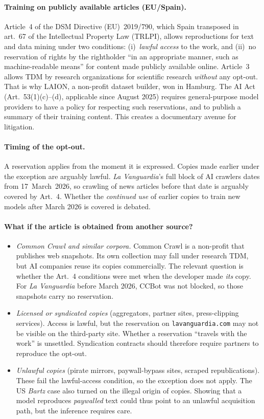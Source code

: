 \documentclass[10pt,a4paper]{article}
\begin{document}
\paragraph{Training on publicly available articles (EU/Spain).} Article~4 of the DSM Directive (EU)~2019/790, which
Spain transposed in art.~67 of the Intellectual Property Law (TRLPI), allows reproductions for text and data mining
under two conditions: (i)~\emph{lawful access} to the work, and (ii)~no reservation of rights by the rightholder ``in
an appropriate manner, such as machine-readable means'' for content made publicly available online. Article~3 allows
TDM by research organizations for scientific research \emph{without} any opt-out. That is why LAION, a non-profit
dataset builder, won in Hamburg. The AI Act (Art.~53(1)(c)--(d), applicable since August 2025) requires
general-purpose model providers to have a policy for respecting such reservations, and to publish a summary of their
training content. This creates a documentary avenue for litigation.

\paragraph{Timing of the opt-out.} A reservation applies from the moment it is expressed. Copies made earlier under
the exception are arguably lawful. \emph{La Vanguardia}'s full block of AI crawlers dates from 17~March~2026, so
crawling of news articles before that date is arguably covered by Art.~4. Whether the \emph{continued use} of earlier
copies to train new models after March 2026 is covered is debated.

\paragraph{What if the article is obtained from another source?}
\begin{itemize}
\item \emph{Common Crawl and similar corpora.} Common Crawl is a non-profit that publishes web snapshots. Its own
collection may fall under research TDM, but AI companies reuse its copies commercially. The relevant question is
whether the Art.~4 conditions were met when the developer made \emph{its} copy. For \emph{La Vanguardia} before March
2026, CCBot was not blocked, so those snapshots carry no reservation.
\item \emph{Licensed or syndicated copies} (aggregators, partner sites, press-clipping services). Access is lawful,
but the reservation on \texttt{lavanguardia.com} may not be visible on the third-party site. Whether a reservation
``travels with the work'' is unsettled. Syndication contracts should therefore require partners to reproduce the
opt-out.
\item \emph{Unlawful copies} (pirate mirrors, paywall-bypass sites, scraped republications). These fail the
lawful-access condition, so the exception does not apply. The US \emph{Bartz} case also turned on the illegal origin
of copies. Showing that a model reproduces \emph{paywalled} text could thus point to an unlawful acquisition path, but
the inference requires care.
\end{itemize}
\end{document}
